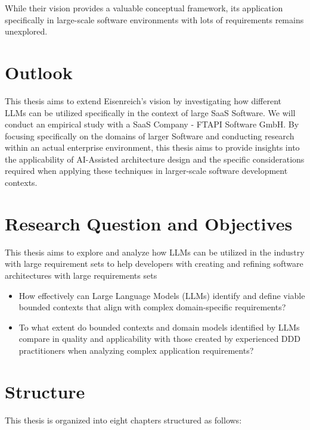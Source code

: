 While their vision provides a valuable conceptual framework, its application specifically in large-scale software environments with lots of requirements remains unexplored. 

\section{Outlook}
This thesis aims to extend Eisenreich's vision by investigating how different LLMs can be utilized specifically in the context of large SaaS Software. We will conduct an empirical study with a SaaS Company - FTAPI Software GmbH. By focusing specifically on the domains of larger Software and conducting research within an actual enterprise environment, this thesis aims to provide insights into the applicability of AI-Assisted architecture design and the specific considerations required when applying these techniques in larger-scale software development contexts.

\section{Research Question and Objectives}

This thesis aims to explore and analyze how LLMs can be utilized in the industry with large requirement sets to help developers with creating and refining software architectures with large requirements sets

\begin{itemize}
    \item How effectively can Large Language Models (LLMs) identify and define viable bounded contexts that align with complex domain-specific requirements?
    \item To what extent do bounded contexts and domain models identified by LLMs compare in quality and applicability with those created by experienced DDD practitioners when analyzing complex application requirements?
\end{itemize}

\section{Structure}

This thesis is organized into eight chapters structured as follows:

